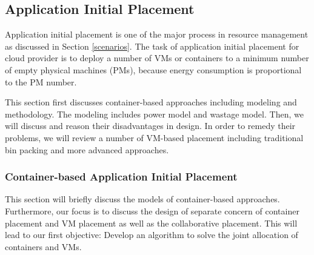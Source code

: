 \subsection{Application Initial Placement}
Application initial placement is one of the major process in resource management as discussed in Section \ref{scenarios}. 
The task of application initial placement for cloud provider is to deploy a number of VMs or containers to a minimum number of empty physical machines (PMs), because energy consumption is proportional to the PM number.

This section first discusses container-based approaches including modeling and methodology. The modeling includes power model and wastage model. Then, we will discuss and reason their disadvantages in design. In order to remedy their problems, we will review a number of VM-based placement including traditional bin packing and more advanced approaches.




\subsubsection{Container-based Application Initial Placement}
\label{container-based-placement}

This section will briefly discuss the models of container-based approaches. Furthermore, our focus is to discuss the design of separate concern of container placement and VM placement as well as the collaborative placement. This will lead to our first objective:  Develop an algorithm to solve the joint allocation of containers and VMs.

